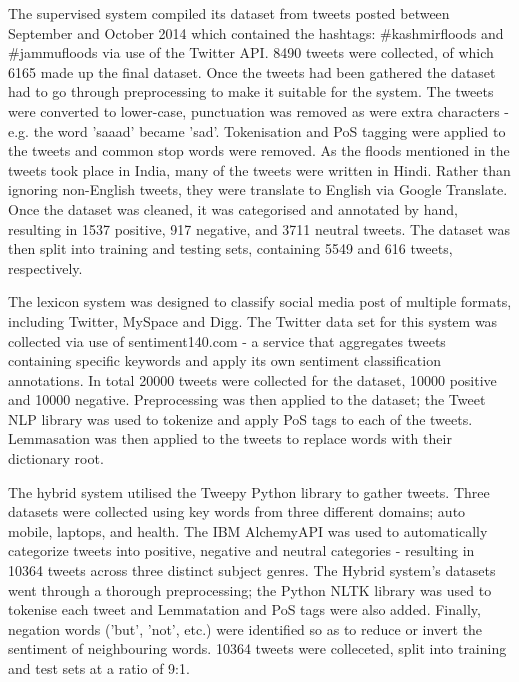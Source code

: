 The supervised system compiled its dataset from tweets posted between September
and October 2014 which contained the hashtags: #kashmirfloods and #jammufloods
via use of the Twitter API.
8490 tweets were collected, of which 6165 made up the final dataset.
Once the tweets had been gathered the dataset had to go through preprocessing
to make it suitable for the system.
The tweets were converted to lower-case, punctuation was removed as were extra
characters - e.g. the word 'saaad' became 'sad'.  
Tokenisation and PoS tagging were applied to the tweets and common stop words
were removed. 
As the floods mentioned in the tweets took place in India, many of the tweets
were written in Hindi.
Rather than ignoring non-English tweets, they were translate to English via
Google Translate.  
Once the dataset was cleaned, it was categorised and annotated by hand,
resulting in 1537 positive, 917 negative, and 3711 neutral tweets.
The dataset was then split into training and testing sets, containing 5549 and
616 tweets, respectively.

The lexicon system was designed to classify social media post of multiple
formats, including Twitter, MySpace and Digg.
The Twitter data set for this system was collected via use of sentiment140.com
- a service that aggregates tweets containing specific keywords and apply its
own sentiment classification annotations.
In total 20000 tweets were collected for the dataset, 10000 positive and 10000
negative.
Preprocessing was then applied to the dataset; the Tweet NLP library was used
to tokenize and apply PoS tags to each of the tweets.
Lemmasation was then applied to the tweets to replace words with their
dictionary root.

The hybrid system utilised the Tweepy Python library to gather tweets.
Three datasets were collected using key words from three different domains; 
auto mobile, laptops, and health.
The IBM  AlchemyAPI was used to automatically categorize tweets into
positive, negative and neutral categories - resulting in 10364 tweets across
three distinct subject genres.
The Hybrid system's datasets went through a thorough preprocessing;
the Python NLTK library was used to tokenise each tweet and Lemmatation and PoS tags were also added.  
Finally, negation words ('but', 'not', etc.) were identified so as to reduce
or invert the sentiment of neighbouring words.
10364 tweets were colleceted, split into training and test sets at a ratio of
9:1.


